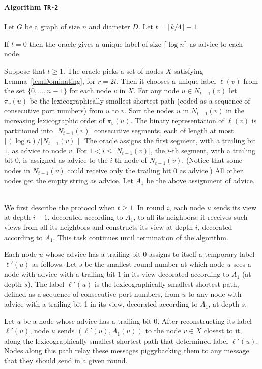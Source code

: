 \documentclass{article}
\newcommand{\algo}[1]{
\medskip
\noindent \textbf{Algorithm {\tt #1}}\\
\nopagebreak}
\begin{document}
\algo{TR-2}
\\
Let $G$ be a graph of size $n$ and diameter $D$. Let $t=\lceil k/4\rceil -1$.

If $t=0$ then the oracle gives a unique label of size $\lceil \log n\rceil$ as advice to each node.

Suppose that $t\ge 1$.
The oracle picks a set of nodes $X$ satisfying Lemma~\ref{lemDominating}, for $r=2t$.
Then it chooses a unique label $\ell(v)$ from the set $\{0, \ldots,  n -1\}$ for each node $v$ in $X$.
For any node $u \in N_{t-1}(v)$ let $\pi_v(u)$ be the lexicographically smallest shortest path (coded as a sequence of consecutive port numbers) from $u$ to $v$.
Sort the nodes $u$ in $N_{t-1}(v)$ in the increasing lexicographic order of $\pi_v(u)$.
The binary representation of $\ell(v)$ is partitioned into $|N_{t-1}(v)|$ consecutive segments, each of length at most $\lceil ( \log n )  / |N_{t-1}(v)|\rceil$.
The oracle assigns the first segment, with a trailing bit $1$,  as advice to node $v$.
For $1<i\le |N_{t-1}(v)|$, the $i$-th segment, with a trailing bit 0, is assigned as advice to the $i$-th  node of $N_{t-1}(v)$. (Notice that some nodes in $N_{t-1}(v)$ could receive only the trailing bit 0 as advice.) All other nodes get the empty string as advice.
Let $A_1$ be the above assignment of advice.

\\
We first describe the protocol when $t\ge 1$.
In round $i$, each node $u$ sends its view at depth $i-1$, decorated according to $A_1$, to all its neighbors;
it receives such views from all its neighbors and constructs its view at depth $i$, decorated according to $A_1$.
This task continues until termination of the algorithm.

Each node $u$ whose advice has a trailing bit $0$ assigns to itself a temporary label $\ell'(u)$ as follows.
Let $s$ be the smallest round number at which node $u$ sees a node with advice with a trailing bit $1$ in its view decorated according to $A_1$  (at depth $s$).
The label $\ell'(u)$ is the lexicographically smallest shortest path, defined as a sequence of consecutive port numbers, from $u$ to any node with advice with a trailing bit 1 in its  view, decorated according to $A_1$, at depth $s$.

Let $u$ be a node whose advice has a trailing bit $0$. After reconstructing its label $\ell'(u)$, node $u$ sends $(\ell'(u),A_1(u))$ to the node $v\in X$ closest to it, along the lexicographically smallest shortest path that determined label $\ell'(u)$. Nodes along this path relay these messages piggybacking them to any message that they should send in a given round.
\end{document}

